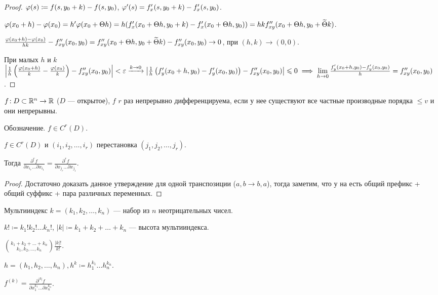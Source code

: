 \begin{proof}
    $\varphi(s) \coloneqq f(s, y_0 + k) - f(s, y_0)$, $\varphi'(s) = f'_x(s, y_0 + k) - f'_x(s, y_0)$.

    $\varphi(x_0+h) - \varphi(x_0) = h'\varphi(x_0 + \Theta h) = h(f'_x(x_0 + \Theta h, y_0 + k) - f'_x(x_0 + \Theta h, y_0)) = hk f''_{xy}(x_0 + \Theta h, y_0 + \widetilde{\Theta}k)$.

    $\frac{\varphi(x_0 + h) - \varphi(x_0)}{hk} - f''_{xy}(x_0, y_0) = f''_{xy}(x_0 + \Theta h, y_0 + \widetilde{\Theta}k) - f''_{xy}(x_0, y_0) \to 0$, при $(h, k) \to (0, 0)$.

    При малых $h$ и  $k$  $\left| \frac{1}{h} \left(\frac{\varphi(x_0 + h)}{k} - \frac{\varphi(x_0)}{k}\right) - f''_{xy}(x_0, y_0) \right| < \varepsilon \xrightarrow{k \to 0} \left| \frac{1}{h} \left( f'_y(x_0+h, y_0) - f'_y(x_0, y_0) \right) - f''_{xy}(x_0, y_0) \right| \leqslant 0 \implies \lim\limits_{h \to 0} \frac{f'_y(x_0+h, y_0) - f'_y(x_0, y_0)}{h} = f''_{xy}(x_0, y_0)$.
\end{proof}
\begin{definition}
    $f\!: D \subset \mathbb{R}^n \to \mathbb{R}$ ($D$ --- открытое), $f$  $r$ раз непрерывно дифференцируема, если у нее существуют все частные производные порядка  $\le v$ и они непрерывны.

    Обозначение. $f \in C^r(D)$.
\end{definition}
\begin{theorem}
    $f \in C^r(D)$ и $(i_1, i_2, \ldots, i_r)$ перестановка $(j_1, j_2,\ldots,j_r)$.

Тогда $\frac{\partial^r f}{\partial x_{i_r}\ldots\partial x_{i_1}} = \frac{\partial^r f}{\partial x_{j_r} \ldots \partial x_{j_1}}$.
\end{theorem}
\begin{proof}
    Достаточно доказать данное утверждение для одной транспозиции ($a, b \to b, a$), тогда заметим, что у на есть общий префикс + общий суффикс + пара различных переменных. 
\end{proof}
\begin{definition}
    Мультииндекс $k = (k_1, k_2, \ldots, k_n)$ --- набор из $n$ неотрицательных чисел.

    $k! \coloneqq k_1!k_2!\ldots k_n!$, $|k| \coloneqq k_1 + k_2 + \ldots + k_n$ --- высота мультииндекса.

    $\binom{k_1 + k_2 + \ldots + k_n}{k_1, k_2, \ldots, k_n} \frac{|k|!}{k!}$.

    $h=(h_1, h_2, \ldots, h_n), h^k \coloneqq h_1^{k_1}\ldots h_n^{k_n}$.

    $f^{(k)} = \frac{\partial^{|k|} f}{\partial x_1^{k_1} \ldots \partial x_n^{k_n}}$.
\end{definition}

